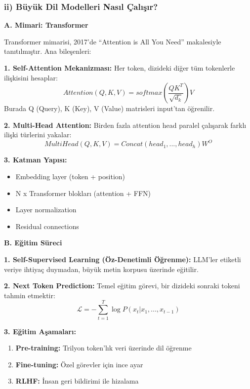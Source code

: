 \documentclass[conference]{IEEEtran}
\begin{document}
\subsubsection*{ii) Büyük Dil Modelleri Nasıl Çalışır?}

\vspace{0.2cm}
\hfill \break
\textbf{A. Mimari: Transformer}

Transformer mimarisi, 2017'de ``Attention is All You Need'' makalesiyle tanıtılmıştır. Ana bileşenleri:

\textbf{1. Self-Attention Mekanizması:}
Her token, dizideki diğer tüm tokenlerle ilişkisini hesaplar:
\begin{equation}
Attention(Q, K, V) = softmax\left(\frac{QK^T}{\sqrt{d_k}}\right)V
\end{equation}
Burada Q (Query), K (Key), V (Value) matrisleri input'tan öğrenilir.

\textbf{2. Multi-Head Attention:}
Birden fazla attention head paralel çalışarak farklı ilişki türlerini yakalar:
\begin{equation}
MultiHead(Q, K, V) = Concat(head_1, ..., head_h)W^O
\end{equation}

\textbf{3. Katman Yapısı:}
\begin{itemize}
    \item Embedding layer (token + position)
    \item N x Transformer blokları (attention + FFN)
    \item Layer normalization
    \item Residual connections
\end{itemize}
\vspace{0.2cm}
\textbf{B. Eğitim Süreci}

\textbf{1. Self-Supervised Learning (Öz-Denetimli Öğrenme):}
LLM'ler etiketli veriye ihtiyaç duymadan, büyük metin korpusu üzerinde eğitilir.

\textbf{2. Next Token Prediction:}
Temel eğitim görevi, bir dizideki sonraki tokeni tahmin etmektir:
\begin{equation}
\mathcal{L} = -\sum_{t=1}^{T} \log P(x_t | x_1, ..., x_{t-1})
\end{equation}

\textbf{3. Eğitim Aşamaları:}
\begin{enumerate}
    \item \textbf{Pre-training:} Trilyon token'lık veri üzerinde dil öğrenme
    \item \textbf{Fine-tuning:} Özel görevler için ince ayar
    \item \textbf{RLHF:} İnsan geri bildirimi ile hizalama
\end{enumerate}
\end{document}
